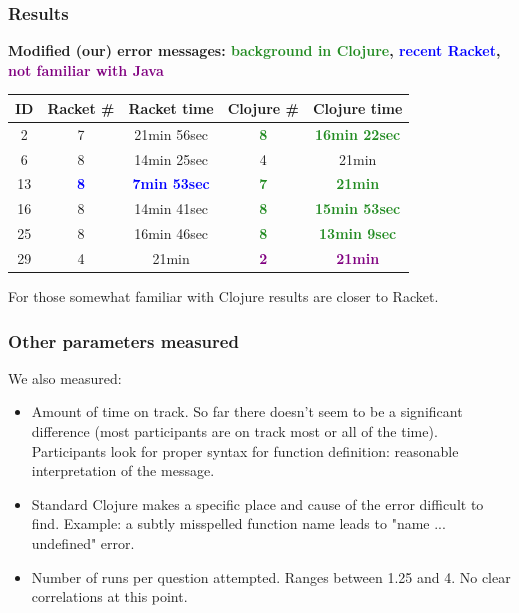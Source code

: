 \documentclass{beamer}
\newcommand{\comment}[1]{{\bf \tt  {#1}}}
\newcommand{\emcomment}[1]{\textcolor{ForestGreen}{\comment{Elena: {#1}}}}
\newcommand{\R}[1]{\textcolor{blue}{\bf {#1}}}
\newcommand{\Cl}[1]{\textcolor{ForestGreen}{\bf {#1}}}
\newcommand{\NoJava}[1]{\textcolor{purple}{\bf {#1}}}
\begin{document}
\begin{frame}
\frametitle{Results}
{\bf Modified (our) error messages:  \Cl{background in Clojure}, \R{recent Racket}, \NoJava{not familiar with Java}}
\vspace{0.1in}

\begin{tabular}{c | c| c| c | c }
\hline
{\bf ID} & {\bf Racket  \#} & {\bf Racket time} & {\bf Clojure  \#} & {\bf Clojure time} \\
\hline 
2 & 7  & 21min 56sec &  \Cl{8} & \Cl{16min 22sec} \\
6 &  8  & 14min 25sec &  4  &  21min \\
13 &  \R{8}  & \R{7min 53sec} &  \Cl{7}  &  \Cl{21min} \\
16 &  8  & 14min 41sec &  \Cl{8}  &  \Cl{15min 53sec} \\
25 &  8  & 16min 46sec &  \Cl{8}  &  \Cl{13min 9sec} \\
29 &  4  & 21min &  \NoJava{2}  & \NoJava{21min} \\
\hline
\end{tabular}
For those somewhat familiar with Clojure results are closer to Racket. 
\end{frame}


\begin{frame}
\frametitle{Other parameters measured}
We also measured:
\begin{itemize}
\item Amount of time on track. So far there doesn't seem to be a significant difference (most participants are on track most or all of the time).
 Participants  look for proper syntax for function definition: reasonable interpretation of the message.  
\item %
Standard Clojure makes a specific place and cause of the error difficult to find. Example: a subtly misspelled function name leads to "name ... undefined" error.
\item Number of runs per question attempted. Ranges between 1.25 and 4. No clear correlations at this point. 
\end{itemize}
\end{frame}

\end{document}
